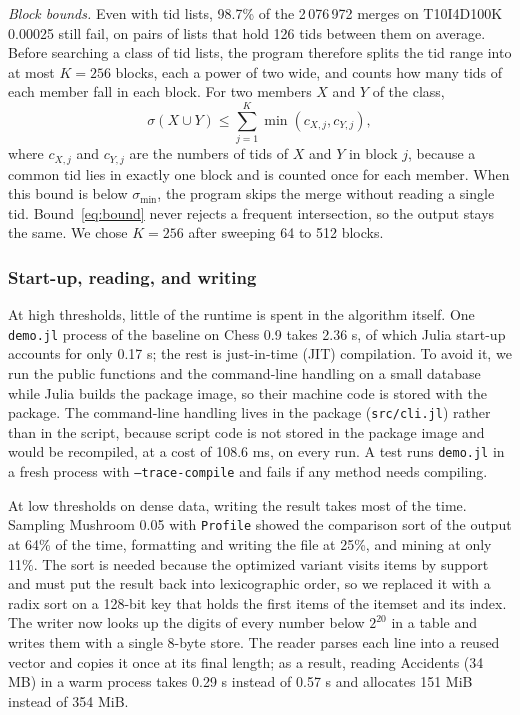 \emph{Block bounds.} Even with tid lists, 98.7\% of the 2\,076\,972 merges on
T10I4D100K 0.00025 still fail, on pairs of lists that hold 126 tids between them on
average. Before searching a class of tid lists, the program therefore splits the tid range
into at most $K = 256$ blocks, each a power of two wide, and counts how many tids of each
member fall in each block. For two members $X$ and $Y$ of the class,
\begin{equation}
  \sigma(X \cup Y) \le \sum_{j=1}^{K} \min(c_{X,j}, c_{Y,j}),
  \label{eq:bound}
\end{equation}
where $c_{X,j}$ and $c_{Y,j}$ are the numbers of tids of $X$ and $Y$ in block $j$,
because a common tid lies in exactly one block and is counted once for each member. When
this bound is below $\sigma_{\min}$, the program skips the merge without reading a single
tid. Bound~\eqref{eq:bound} never rejects a frequent intersection, so the output stays the
same. We chose $K = 256$ after sweeping 64 to 512 blocks.

\subsubsection{Start-up, reading, and writing}
At high thresholds, little of the runtime is spent in the algorithm itself. One \texttt{demo.jl}
process of the baseline on Chess 0.9 takes 2.36 s, of which Julia start-up accounts for
only 0.17 s; the rest is just-in-time (JIT) compilation. To avoid it, we run the public
functions and the command-line handling on a small database while Julia builds the
package image, so their machine code is stored with the package. The command-line
handling lives in the package (\texttt{src/cli.jl}) rather than in the script, because
script code is not stored in the package image and would be recompiled, at a cost of
108.6 ms, on every run. A test runs \texttt{demo.jl} in a fresh process with
\texttt{--trace-compile} and fails if any method needs compiling.

At low thresholds on dense data, writing the result takes most of the time. Sampling
Mushroom 0.05 with \texttt{Profile} showed the comparison sort of the output at 64\% of
the time, formatting and writing the file at 25\%, and mining at only 11\%. The sort is
needed because the optimized variant visits items by support and must put the result
back into lexicographic order, so we replaced it with a radix sort on a 128-bit key that
holds the first items of the itemset and its index. The writer now looks up the digits of
every number below $2^{20}$ in a table and writes them with a single 8-byte store. The
reader parses each line into a reused vector and copies it once at its final length; as
a result, reading Accidents (34 MB) in a warm process takes 0.29 s instead of 0.57 s and
allocates 151 MiB instead of 354 MiB.

